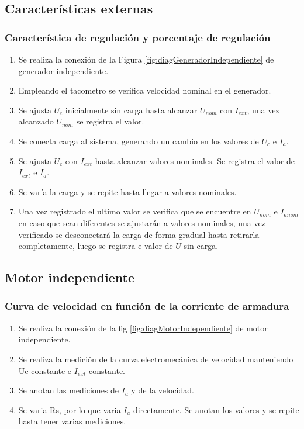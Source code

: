 \documentclass[11pt,letterpaper]{article}     %
\begin{document}
\subsection{Características externas}
\subsubsection{Característica de regulación y porcentaje de regulación}
\begin{enumerate}
    \item Se realiza la conexión de la Figura \ref{fig:diagGeneradorIndependiente} de generador independiente.
    \item Empleando el tacometro se verifica velocidad nominal en el generador.
    \item Se ajusta $U_{c}$ inicialmente sin carga hasta alcanzar $U_{nom}$ con $I_{ext}$, una vez alcanzado $U_{nom}$ se registra el valor.
    \item Se conecta carga al sistema, generando un cambio en los valores de $U_{c}$ e $I_a$.
    \item Se ajusta $U_{c}$ con $I_{ext}$ hasta alcanzar valores nominales. Se registra el valor de $I_{ext}$ e $I_a$.
    \item Se varía la carga y se repite hasta llegar a valores nominales.
    \item Una vez registrado el ultimo valor se verifica que se encuentre en $U_{nom}$ e $I_{anom}$ en caso que sean diferentes se ajustarán a valores nominales, una vez verificado se desconectará la carga de forma gradual hasta retirarla completamente, luego se registra e valor de $U$ sin carga. 
\end{enumerate}
\subsection{Motor independiente}
\subsubsection{Curva de velocidad en función de la corriente de armadura}
\begin{enumerate}
    \item Se realiza la conexión de la fig \ref{fig:diagMotorIndependiente} de motor independiente.
    \item Se realiza la medición de la curva electromecánica de velocidad manteniendo Uc constante e $I_{ext}$ constante.
    \item Se anotan las mediciones de $I_a$ y de la velocidad.
    \item Se varia Rs, por lo que varia $I_a$ directamente. Se anotan los valores y se repite hasta tener varias mediciones.
\end{enumerate}
\end{document}

